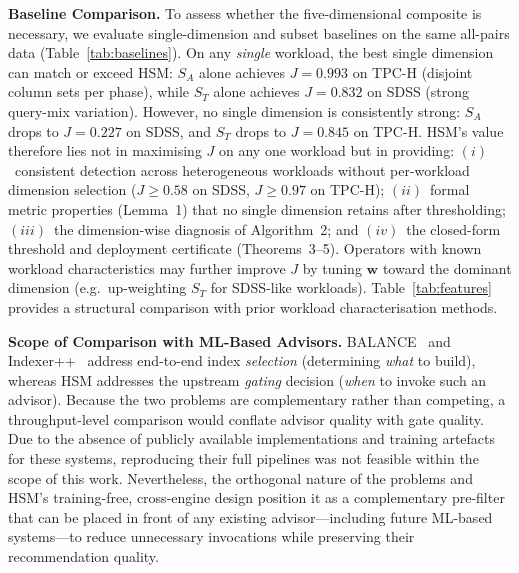 \documentclass[10pt,twocolumn,a4paper]{article}
\newcommand{\ST}{S_{T}}
\newcommand{\SA}{S_{A}}
\begin{document}
\textbf{Baseline Comparison.}\label{sec:comparative}
To assess whether the five-dimensional composite is necessary, we
evaluate single-dimension and subset baselines on the same all-pairs
data (Table~\ref{tab:baselines}). On any \emph{single} workload, the
best single dimension can match or exceed HSM: $\SA$ alone achieves
$J\!=\!0.993$ on TPC-H (disjoint column sets per phase), while $\ST$
alone achieves $J\!=\!0.832$ on SDSS (strong query-mix variation).
However, no single dimension is consistently strong: $\SA$ drops to
$J\!=\!0.227$ on SDSS, and $\ST$ drops to $J\!=\!0.845$ on TPC-H.
HSM's value therefore lies not in maximising $J$ on any one workload
but in providing: $(i)$~consistent detection across heterogeneous
workloads without per-workload dimension selection ($J\!\ge\!0.58$
on SDSS, $J\!\ge\!0.97$ on TPC-H); $(ii)$~formal metric properties
(Lemma~1) that no single dimension retains after thresholding;
$(iii)$~the dimension-wise diagnosis of Algorithm~2; and
$(iv)$~the closed-form threshold and deployment certificate
(Theorems~3--5). Operators with known workload characteristics may
further improve $J$ by tuning $\mathbf{w}$ toward the dominant
dimension (e.g.\ up-weighting $\ST$ for SDSS-like workloads).
Table~\ref{tab:features} provides a structural comparison with
prior workload characterisation methods.

\textbf{Scope of Comparison with ML-Based Advisors.}
BALANCE~\cite{Wang2024BALANCE} and Indexer++~\cite{Sharma2022IndexerPP}
address end-to-end index \emph{selection} (determining \emph{what} to
build), whereas HSM addresses the upstream \emph{gating} decision
(\emph{when} to invoke such an advisor).
Because the two problems are complementary rather than competing, a
throughput-level comparison would conflate advisor quality with gate
quality.
Due to the absence of publicly available implementations and training
artefacts for these systems, reproducing their full pipelines was not
feasible within the scope of this work.
Nevertheless, the orthogonal nature of the problems and HSM's
training-free, cross-engine design position it as a complementary
pre-filter that can be placed in front of any existing advisor---including
future ML-based systems---to reduce unnecessary invocations while
preserving their recommendation quality.
\end{document}
